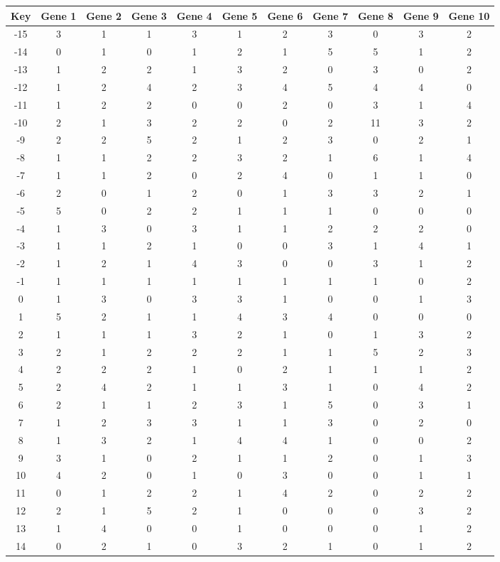 \begin{tabular}{|c|c|c|c|c|c|c|c|c|c|c|}
\hline
Key & Gene 1 & Gene 2 & Gene 3 & Gene 4 & Gene 5 & Gene 6 & Gene 7 & Gene 8 & Gene 9 & Gene 10 \\
\hline
-15 & 3 & 1 & 1 & 3 & 1 & 2 & 3 & 0 & 3 & 2 \\
-14 & 0 & 1 & 0 & 1 & 2 & 1 & 5 & 5 & 1 & 2 \\
-13 & 1 & 2 & 2 & 1 & 3 & 2 & 0 & 3 & 0 & 2 \\
-12 & 1 & 2 & 4 & 2 & 3 & 4 & 5 & 4 & 4 & 0 \\
-11 & 1 & 2 & 2 & 0 & 0 & 2 & 0 & 3 & 1 & 4 \\
-10 & 2 & 1 & 3 & 2 & 2 & 0 & 2 & 11 & 3 & 2 \\
-9 & 2 & 2 & 5 & 2 & 1 & 2 & 3 & 0 & 2 & 1 \\
-8 & 1 & 1 & 2 & 2 & 3 & 2 & 1 & 6 & 1 & 4 \\
-7 & 1 & 1 & 2 & 0 & 2 & 4 & 0 & 1 & 1 & 0 \\
-6 & 2 & 0 & 1 & 2 & 0 & 1 & 3 & 3 & 2 & 1 \\
-5 & 5 & 0 & 2 & 2 & 1 & 1 & 1 & 0 & 0 & 0 \\
-4 & 1 & 3 & 0 & 3 & 1 & 1 & 2 & 2 & 2 & 0 \\
-3 & 1 & 1 & 2 & 1 & 0 & 0 & 3 & 1 & 4 & 1 \\
-2 & 1 & 2 & 1 & 4 & 3 & 0 & 0 & 3 & 1 & 2 \\
-1 & 1 & 1 & 1 & 1 & 1 & 1 & 1 & 1 & 0 & 2 \\
0 & 1 & 3 & 0 & 3 & 3 & 1 & 0 & 0 & 1 & 3 \\
1 & 5 & 2 & 1 & 1 & 4 & 3 & 4 & 0 & 0 & 0 \\
2 & 1 & 1 & 1 & 3 & 2 & 1 & 0 & 1 & 3 & 2 \\
3 & 2 & 1 & 2 & 2 & 2 & 1 & 1 & 5 & 2 & 3 \\
4 & 2 & 2 & 2 & 1 & 0 & 2 & 1 & 1 & 1 & 2 \\
5 & 2 & 4 & 2 & 1 & 1 & 3 & 1 & 0 & 4 & 2 \\
6 & 2 & 1 & 1 & 2 & 3 & 1 & 5 & 0 & 3 & 1 \\
7 & 1 & 2 & 3 & 3 & 1 & 1 & 3 & 0 & 2 & 0 \\
8 & 1 & 3 & 2 & 1 & 4 & 4 & 1 & 0 & 0 & 2 \\
9 & 3 & 1 & 0 & 2 & 1 & 1 & 2 & 0 & 1 & 3 \\
10 & 4 & 2 & 0 & 1 & 0 & 3 & 0 & 0 & 1 & 1 \\
11 & 0 & 1 & 2 & 2 & 1 & 4 & 2 & 0 & 2 & 2 \\
12 & 2 & 1 & 5 & 2 & 1 & 0 & 0 & 0 & 3 & 2 \\
13 & 1 & 4 & 0 & 0 & 1 & 0 & 0 & 0 & 1 & 2 \\
14 & 0 & 2 & 1 & 0 & 3 & 2 & 1 & 0 & 1 & 2 \\
\hline
\end{tabular}